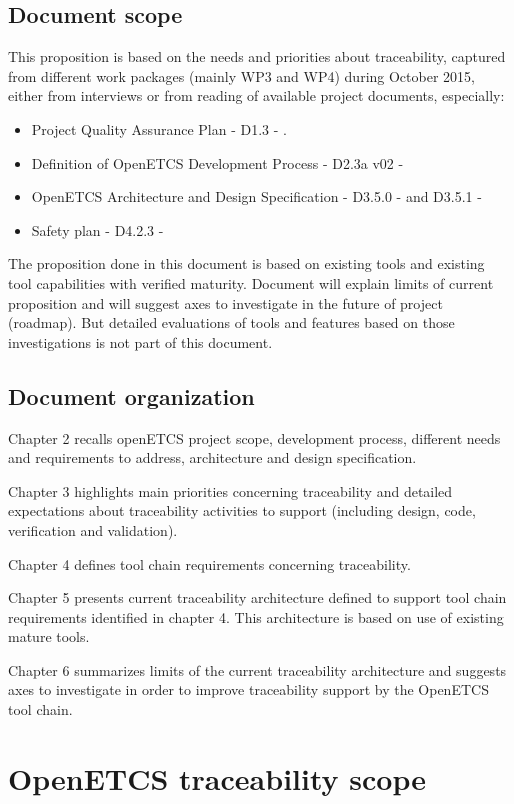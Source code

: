 \documentclass[11pt]{template/openetcs_report}
\begin{document}
\section{Document scope}
This proposition is based on the needs and priorities about traceability, captured from different work packages (mainly WP3 and WP4) during October 2015, either from interviews or from reading of available project documents, especially:
\begin{itemize} 
\item Project Quality Assurance Plan - D1.3 - \cite{qa-plan}.
\item Definition of OpenETCS Development Process - D2.3a v02 - \cite{D2.3a}
\item OpenETCS Architecture and Design Specification - D3.5.0 - \cite{D3.5.0}  and D3.5.1 - \cite{D3.5.3}
\item Safety plan - D4.2.3 - \cite{D4.2.3}
\end{itemize}

The proposition done in this document is based on existing tools and existing tool capabilities with verified maturity. Document will explain limits of current proposition and will suggest axes to investigate in the future of project (roadmap).
But detailed evaluations of tools and features based on those investigations is not part of this document.

\section{Document organization}
Chapter 2 recalls openETCS project scope, development process, different needs and requirements to address, architecture and design specification.

Chapter 3 highlights main priorities concerning traceability and detailed expectations about traceability activities to support (including design, code, verification and validation).

Chapter 4 defines tool chain requirements concerning traceability.

Chapter 5 presents current traceability architecture defined to support tool chain requirements identified in chapter 4. This architecture is based on use of existing mature tools.

Chapter 6 summarizes limits of the current traceability architecture and suggests axes to investigate in order to improve traceability support by the OpenETCS tool chain.

\chapter{OpenETCS traceability scope}
\end{document}
